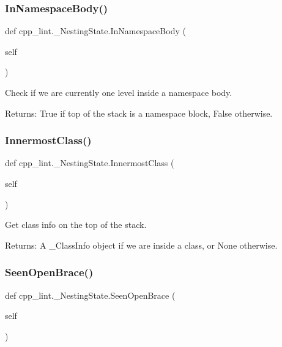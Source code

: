 \subsubsection{\texorpdfstring{In\+Namespace\+Body()}{InNamespaceBody()}}
{\footnotesize\ttfamily def cpp\+\_\+lint.\+\_\+\+Nesting\+State.\+In\+Namespace\+Body (\begin{DoxyParamCaption}\item[{}]{self }\end{DoxyParamCaption})}

\begin{DoxyVerb}Check if we are currently one level inside a namespace body.

Returns:
  True if top of the stack is a namespace block, False otherwise.
\end{DoxyVerb}
 \mbox{\label{classcpp__lint_1_1___nesting_state_a19adbe5a4b2f7baef867ee9385bf29af}} 
\subsubsection{\texorpdfstring{Innermost\+Class()}{InnermostClass()}}
{\footnotesize\ttfamily def cpp\+\_\+lint.\+\_\+\+Nesting\+State.\+Innermost\+Class (\begin{DoxyParamCaption}\item[{}]{self }\end{DoxyParamCaption})}

\begin{DoxyVerb}Get class info on the top of the stack.

Returns:
  A _ClassInfo object if we are inside a class, or None otherwise.
\end{DoxyVerb}
 \mbox{\label{classcpp__lint_1_1___nesting_state_a19f7e1db39b5e5bcdac60560dfaaf895}} 
\subsubsection{\texorpdfstring{Seen\+Open\+Brace()}{SeenOpenBrace()}}
{\footnotesize\ttfamily def cpp\+\_\+lint.\+\_\+\+Nesting\+State.\+Seen\+Open\+Brace (\begin{DoxyParamCaption}\item[{}]{self }\end{DoxyParamCaption})}

